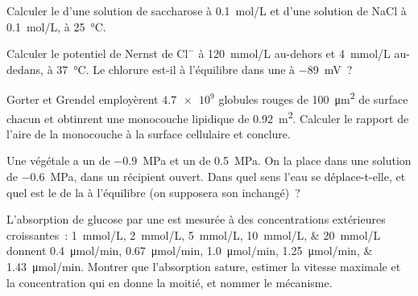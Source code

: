 \begin{exercise}[$\star$]\label{exo:b1:membranes-transport:3}
Calculer le  d'une solution de saccharose à
\qty{0.1}{mol/L} et d'une solution de NaCl à \qty{0.1}{mol/L}, à
\qty{25}{\celsius}.
\end{exercise}

\begin{exercise}[$\star$]\label{exo:b1:membranes-transport:4}
Calculer le potentiel de Nernst de $\mathrm{Cl^-}$ à \qty{120}{mmol/L}
au-dehors et \qty{4}{mmol/L} au-dedans, à \qty{37}{\celsius}. Le
chlorure est-il à l'équilibre dans une  à \qty{-89}{mV}~?
\end{exercise}

\begin{exercise}[$\star\star$]\label{exo:b1:membranes-transport:5}
Gorter et Grendel employèrent $\num{4.7e9}$ globules rouges de
\qty{100}{\micro m^2} de surface chacun et obtinrent une monocouche
lipidique de \qty{0.92}{m^2}. Calculer le rapport de l'aire de la
monocouche à la surface cellulaire et conclure.
\end{exercise}

\begin{exercise}[$\star\star$]\label{exo:b1:membranes-transport:6}
Une  végétale a un  de \qty{-0.9}{MPa} et un
 de \qty{0.5}{MPa}. On la place dans une solution
de  \qty{-0.6}{MPa}, dans un récipient ouvert. Dans
quel sens l'eau se déplace-t-elle, et quel est le 
de la  à l'équilibre (on supposera son 
inchangé)~?
\end{exercise}

\begin{exercise}[$\star\star$]\label{exo:b1:membranes-transport:7}
L'absorption de glucose par une  est mesurée à des
concentrations extérieures croissantes~: \qtylist{1;2;5;10;20}{mmol/L}
donnent \qtylist{0.4;0.67;1.0;1.25;1.43}{\micro mol/min}. Montrer que
l'absorption sature, estimer la vitesse maximale et la concentration
qui en donne la moitié, et nommer le mécanisme.
\end{exercise}

